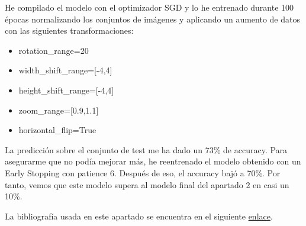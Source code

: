 \documentclass[10pt,a4paper]{article}
\begin{document}
He compilado el modelo con el optimizador SGD y lo he entrenado durante 100 épocas normalizando los conjuntos de imágenes y aplicando un aumento de datos con las siguientes transformaciones:

\begin{itemize}
\item rotation\_range=20
\item width\_shift\_range=[-4,4]
\item height\_shift\_range=[-4,4]
\item zoom\_range=[0.9,1.1]
\item horizontal\_flip=True
\end{itemize}

La predicción sobre el conjunto de test me ha dado un 73\% de accuracy. Para asegurarme que no podía mejorar más, he reentrenado el modelo obtenido con un Early Stopping con patience 6. Después de eso, el accuracy bajó a 70\%. Por tanto, vemos que este modelo supera al modelo final del apartado 2 en casi un 10\%.

La bibliografía usada en este apartado se encuentra en el siguiente \href{https://www.pyimagesearch.com/2019/10/28/3-ways-to-create-a-keras-model-with-tensorflow-2-0-sequential-functional-and-model-subclassing/}{enlace}.
\end{document}
